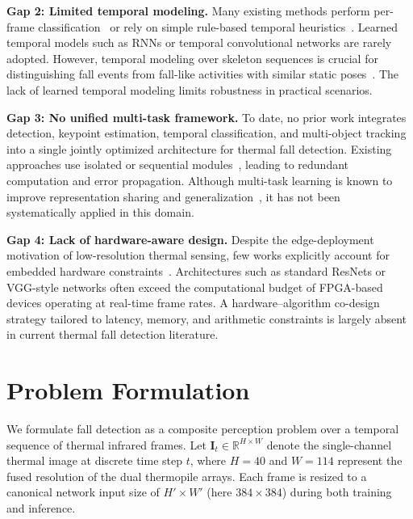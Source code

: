 \textbf{Gap 2: Limited temporal modeling.} 
Many existing methods perform per-frame classification~\cite{vadivelu2016thermal,nogas2020fall} or rely on simple rule-based temporal heuristics~\cite{mashiyama2015activity}. Learned temporal models such as RNNs or temporal convolutional networks are rarely adopted. However, temporal modeling over skeleton sequences is crucial for distinguishing fall events from fall-like activities with similar static poses~\cite{du2015hierarchical,yan2018spatial}. The lack of learned temporal modeling limits robustness in practical scenarios.

\textbf{Gap 3: No unified multi-task framework.} 
To date, no prior work integrates detection, keypoint estimation, temporal classification, and multi-object tracking into a single jointly optimized architecture for thermal fall detection. Existing approaches use isolated or sequential modules~\cite{cao2017realtime}, leading to redundant computation and error propagation. Although multi-task learning is known to improve representation sharing and generalization~\cite{caruana1997multitask,ruder2017overview}, it has not been systematically applied in this domain.

\textbf{Gap 4: Lack of hardware-aware design.} 
Despite the edge-deployment motivation of low-resolution thermal sensing, few works explicitly account for embedded hardware constraints~\cite{sze2017efficient}. Architectures such as standard ResNets or VGG-style networks often exceed the computational budget of FPGA-based devices operating at real-time frame rates. A hardware–algorithm co-design strategy tailored to latency, memory, and arithmetic constraints is largely absent in current thermal fall detection literature.


\section{Problem Formulation}
\label{sec:intro_formulation}

We formulate fall detection as a composite perception problem over a temporal sequence of thermal infrared frames. Let $\mathbf{I}_t \in \mathbb{R}^{H \times W}$ denote the single-channel thermal image at discrete time step $t$, where $H=40$ and $W=114$ represent the fused resolution of the dual thermopile arrays. Each frame is resized to a canonical network input size of $H' \times W'$ (here $384 \times 384$) during both training and inference.

